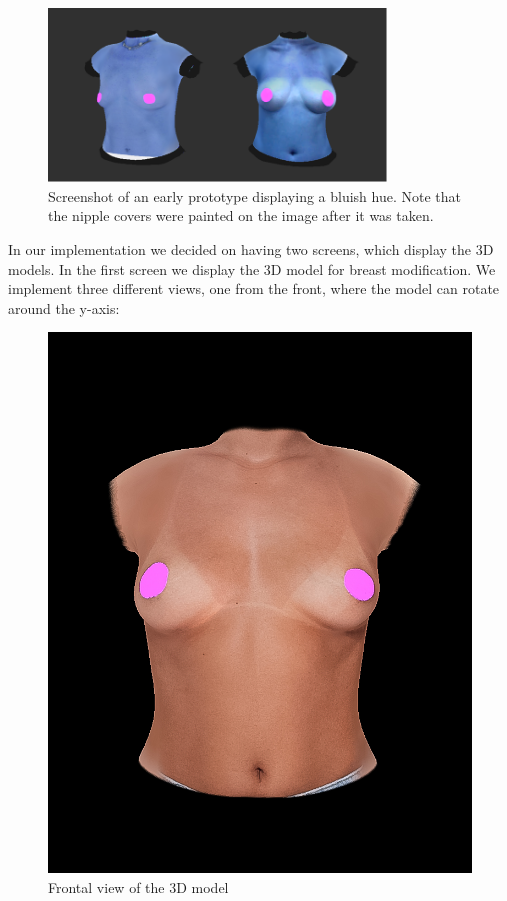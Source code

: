 \begin{figure}[H]
    \centering
    \includegraphics[width = 0.8\textwidth]{figures/blue_tone.png}
    \caption[Bluish hue]{Screenshot of an early prototype displaying a bluish hue. Note that the nipple covers were painted on the image after it was taken.}
    \label{fig:blue_tone}
\end{figure}

In our implementation we decided on having two screens, which display the 3D models. In the first screen we display the 3D model for breast modification. We implement three different views,
one from the front, where the model can rotate around the y-axis:

\begin{figure}[H]
    \centering
    \includegraphics{figures/20230529-frontal_view.jpg}
    \caption{Frontal view of the 3D model}
    \label{fig:frontal_view}
\end{figure}

